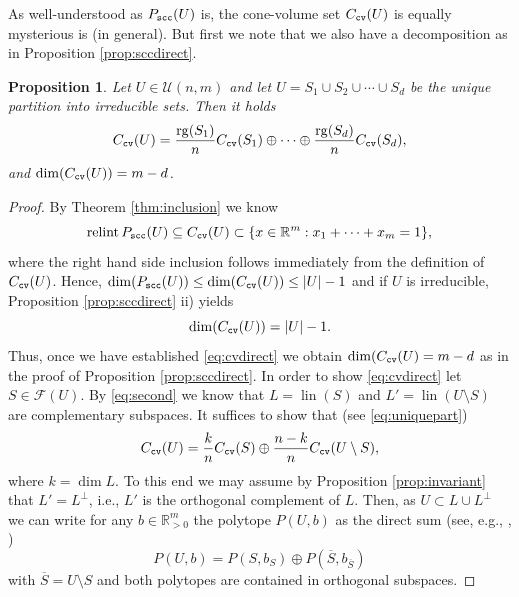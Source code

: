 \documentclass[11pt, a4paper, twoside, reqno]{amsart}
\DeclareMathOperator*{\lin}{lin}
\DeclareMathOperator*{\rg}{rg}
\newcommand{\R}{\mathbb{R}}
\newtheorem{proposition}[theorem]{Proposition}
\theoremstyle{definition}
\theoremstyle{remark}
\newcommand{\scc}{{\tt scc}}
\newcommand{\cv}{{\tt cv}}
\newcommand{\ov}{\overline}
\DeclareMathOperator{\relint}{relint}
\numberwithin{equation}{section}
\begin{document}
As well-understood as $P_\scc(U)$ is, the cone-volume set $C_\cv(U)$ is equally mysterious is (in general). But first we note that we also have a decomposition as in
Proposition \ref{prop:sccdirect}.
\begin{proposition} Let $U\in\mathcal{U}(n,m)$ and let $U=S_1\cup S_2 \cup
  \cdots \cup S_d$ be the unique partition into irreducible sets. Then it holds
\begin{equation}
   C_\cv(U)=\frac{\rg(S_1)}{n}C_\cv(S_1)\oplus \cdots \oplus\frac{\rg(S_d)}{n}C_\cv(S_d),
\label{eq:cvdirect}
 \end{equation}
 and $\dim(C_\cv(U))=m-d$.
\label{prop:cvdirect}
\end{proposition}
\begin{proof} By Theorem \ref{thm:inclusion} we know
  \begin{equation*}
              \relint P_\scc(U)\subseteq C_\cv(U)\subset \{x\in\R^m :
              x_1+\cdots +x_m=1\},
  \end{equation*}
where the right hand side inclusion follows immediately from the
definition of $C_\cv(U)$. Hence, $\dim(P_\scc(U))\leq
\dim(C_\cv(U))\leq |U|-1$ and if $U$ is irreducible, Proposition
\ref{prop:sccdirect} ii) yields
\begin{equation*}
                \dim(C_\cv(U))=|U|-1.
\end{equation*}
Thus, once we have established \eqref{eq:cvdirect} we obtain
$\dim(C_\cv(U)=m-d$ as in the proof of Proposition \ref{prop:sccdirect}.
In order to show \eqref{eq:cvdirect} let $S\in\mathcal{F}(U)$.
  By \eqref{eq:second} we know that $L=\lin(S)$ and
  $L'=\lin(U\setminus S)$ are complementary subspaces. It suffices to show
  that (see \eqref{eq:uniquepart})
  \begin{equation}
       C_\cv(U)= \frac{k}{n} C_\cv(S)\oplus \frac{n-k}{n}
     C_\cv(U\setminus S),
  \label{eq:toshow}
  \end{equation}
where $k=\dim L$. To this end we may assume by Proposition
\ref{prop:invariant} that $L'=L^\perp$, i.e., $L'$ is
the orthogonal complement of $L$. Then, as $U\subset L\cup L^\perp$ we
can write for any $b\in\R^m_{>0}$ the polytope $P(U,b)$ as the direct sum (see, e.g., \cite[][Lem.~3.1]{henk2014cone},
\cite[][Prop.~3.5]{BoeroeczkyHenk2016a} )
\begin{equation}
  P(U,b)=P(S,b_S)\oplus P(\ov S,b_{\ov S})
 \label{eq:directsumpoly}
     \end{equation}
     with $\ov S=U\setminus S$ and both polytopes are contained in
     orthogonal subspaces.

\end{proof}
\end{document}
